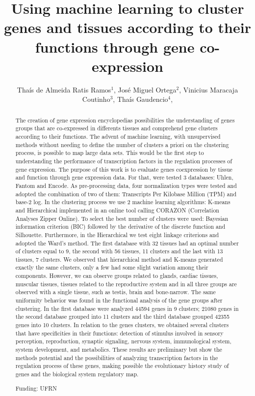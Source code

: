 \documentclass[twoside]{article}
\title{\vspace{-15mm}\fontsize{24pt}{10pt}\selectfont\textbf{ Using machine learning to cluster genes and tissues according to their functions through gene co-expression }} %
\author{ Thaís de Almeida Ratis Ramos$^{1}$, José Miguel Ortega$^{2}$, Vinicius Maracaja Coutinho$^{3}$, Thaís Gaudencio$^{4}$, }
\affil{ 1 UFRN

2 Universidade Federal de Minas Gerais Laboratório de Biodados

3 Universidad Mayor

4 UFPB

 }
\date{}
\begin{document}
  
  
  \maketitle %
  
  
  \thispagestyle{fancy} %
  
  
  \begin{abstract}
  The creation of gene expression encyclopedias possibilities the understanding of genes groups that are co-expressed in differents tissues and comprehend gene clusters according to their functions. The advent of machine learning, with unsupervised methods without needing to define the number of clusters a priori on the clustering process, is possible to map large data sets. This would be the first step to understanding the performance of transcription factors in the regulation processes of gene expression. The purpose of this work is to evaluate genes coexpression by tissue and function through gene expression data. For that, were tested 3 databases: Uhlen, Fantom and Encode. As pre-processing data, four normalization types were tested and adopted the combination of two of them: Transcripts Per Kilobase Million (TPM) and base-2 log. In the clustering process we use 2 machine learning algorithms: K-means and Hierarchical implemented in an online tool calling CORAZON (Correlation Analyses Zipper Online). To select the best number of clusters were used: Bayesian information criterion (BIC) followed by the derivative of the discrete function and Silhouette. Furthermore, in the Hierarchical we test eight linkage criterions and adopted the Ward’s method. The first database with 32 tissues had an optimal number of clusters equal to 9, the second with 56 tissues, 11 clusters and the last with 13 tissues, 7 clusters. We observed that hierarchical method and K-means generated exactly the same clusters, only a few had some slight variation among their components. However, we can observe groups related to glands, cardiac tissues, muscular tissues, tissues related to the reproductive system and in all three groups are observed with a single tissue, such as testis, brain and bone-narrow. The same uniformity behavior was found in the functional analysis of the gene groups after clustering. In the first database were analyzed 44594 genes in 9 clusters; 21080 genes in the second database grouped into 11 clusters and the third database grouped 42355 genes into 10 clusters. In relation to the genes clusters, we obtained several clusters that have specificities in their functions: detection of stimulus involved in sensory perception, reproduction, synaptic signaling, nervous system, immunological system, system development, and metabolics. These results are preliminary but show the methods potential and the possibilities of analyzing transcription factors in the regulation process of these genes, making possible the evolutionary history study of genes and the biological system regulatory map.
  
  Funding: UFRN \\ 
  \end{abstract}
  
\end{document}
